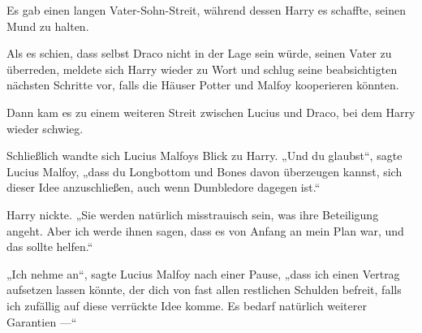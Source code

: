Es gab einen langen Vater-Sohn-Streit, während dessen Harry es schaffte, seinen Mund zu halten.

Als es schien, dass selbst Draco nicht in der Lage sein würde, seinen Vater zu überreden, meldete sich Harry wieder zu Wort und schlug seine beabsichtigten nächsten Schritte vor, falls die Häuser Potter und Malfoy kooperieren könnten.

Dann kam es zu einem weiteren Streit zwischen Lucius und Draco, bei dem Harry wieder schwieg.

Schließlich wandte sich Lucius Malfoys Blick zu Harry.
„Und du glaubst“, sagte Lucius Malfoy, „dass du Longbottom und Bones davon überzeugen kannst, sich dieser Idee anzuschließen, auch wenn Dumbledore dagegen ist.“

Harry nickte.
„Sie werden natürlich misstrauisch sein, was ihre Beteiligung angeht. Aber ich werde ihnen sagen, dass es von Anfang an mein Plan war, und das sollte helfen.“

„Ich nehme an“, sagte Lucius Malfoy nach einer Pause, „dass ich einen Vertrag aufsetzen lassen könnte, der dich von fast allen restlichen Schulden befreit, falls ich zufällig auf diese verrückte Idee komme. Es bedarf natürlich weiterer Garantien —“

